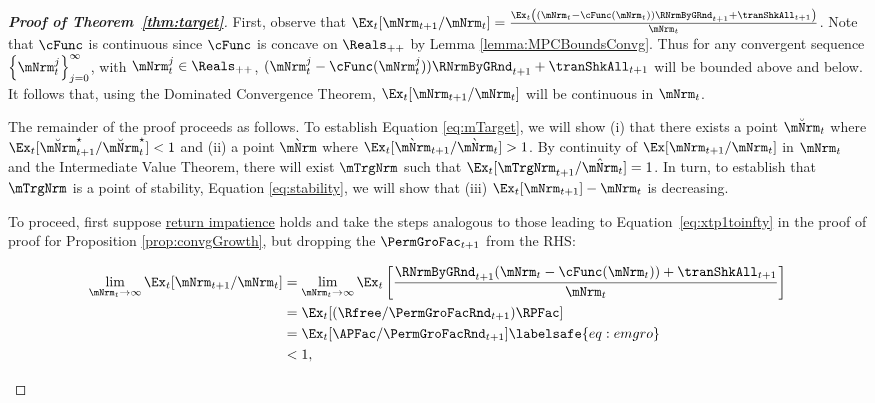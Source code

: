 \documentclass[\econtexRoot/BufferStockTheory]{subfiles}
\begin{document}
\begin{proof}[\textbf{Proof of Theorem~\ref{thm:target}}]

First, observe that $\Ex_{t}[{\mNrm}_{t+1}/\mNrm_t] = \frac{\Ex_{t}\left((\mNrm_t - \cFunc(\mNrm_t)) \RNrmByGRnd_{t+1} + \tranShkAll_{t+1}\right)}{\mNrm_t}$. Note that $\cFunc$ is continuous since $\cFunc$ is concave on $\Reals_{++}$ by Lemma \ref{lemma:MPCBoundsConvg}. Thus for any convergent sequence $\left\{\mNrm_t^{j}\right\}_{j=0}^{\infty}$, with $\mNrm_t^{j}\in \Reals_{++}$, $(\mNrm_t^{j} - \cFunc(\mNrm_t^{j})) \RNrmByGRnd_{t+1} + \tranShkAll_{t+1}$ will be bounded above and below. It follows that, using the Dominated Convergence Theorem, $\Ex_{t}[{\mNrm}_{t+1}/\mNrm_t]$ will be continuous in $\mNrm_t$. 


The remainder of the proof proceeds as follows. To establish Equation \eqref{eq:mTarget}, we will show (i) that there exists a point $\breve{\mNrm}_{t}$ where $\Ex_t [\breve{\mNrm}_{t+1}^{\star}/\breve{\mNrm}_{t}^{\star}] < 1$ and (ii) a point $\grave{\mNrm}$ where $\Ex_t [\grave{\mNrm}_{t+1}/\grave{\mNrm}_{t}] > 1$.
By continuity of $\Ex[{\mNrm}_{t+1}/\mNrm_t]$ in $\mNrm_t$ and the Intermediate Value Theorem, there will exist $\mTrgNrm$ such that  $\Ex_t [{\mTrgNrm}_{t+1}/\hat{\mNrm}_{t}] = 1$.
In turn, to establish that $\mTrgNrm$ is a point of stability, Equation \eqref{eq:stability}, we will show that (iii) $\Ex_t [{\mNrm}_{t+1}]-\mNrm_{t}$ is decreasing. 


To proceed, first suppose \hyperlink{RIC}{return impatience} holds and take the steps analogous to those leading to Equation~\eqref{eq:xtp1toinfty} in the proof of proof for Proposition \ref{prop:convgGrowth},  but dropping the $\PermGroFac_{t+1}$ from the RHS:
\begin{samepage}
\begin{align}
  \lim_{\mNrm_{t} \rightarrow \infty} \Ex_{t}[{\mNrm}_{t+1}/\mNrm_{t}]  & =   
                                                                       \lim_{\mNrm_{t} \rightarrow \infty} 
                                                                       \Ex_{t}\left[\frac{\RNrmByGRnd_{t+1}(\mNrm_{t}-\cFunc(\mNrm_{t}))+{\tranShkAll}_{t+1}}{\mNrm_{t}}\right] \notag 
  \\  & = \Ex_{t}[(\Rfree/{\PermGroFacRnd}_{t+1})\RPFac]  \notag
  \\  & = \Ex_{t}[{\APFac}/{\PermGroFacRnd}_{t+1}]  \labelsafe{eq:emgro}
  \\  & < 1, \notag
\end{align}
\end{samepage}


\end{proof}
\end{document}
